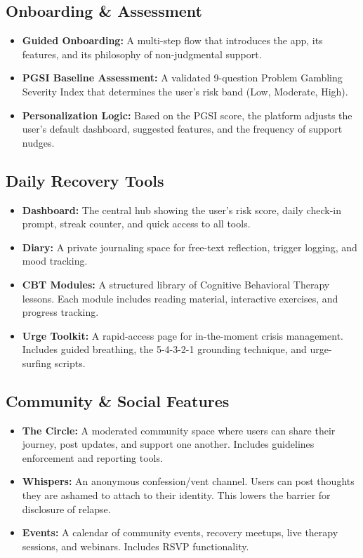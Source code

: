\documentclass[11pt,a4paper]{article}
\begin{document}
\subsection{Onboarding \& Assessment}
\begin{itemize}
    \item \textbf{Guided Onboarding:} A multi-step flow that introduces the app, its features, and its philosophy of non-judgmental support.
    \item \textbf{PGSI Baseline Assessment:} A validated 9-question Problem Gambling Severity Index that determines the user's risk band (Low, Moderate, High).
    \item \textbf{Personalization Logic:} Based on the PGSI score, the platform adjusts the user's default dashboard, suggested features, and the frequency of support nudges.
\end{itemize}

\subsection{Daily Recovery Tools}
\begin{itemize}
    \item \textbf{Dashboard:} The central hub showing the user's risk score, daily check-in prompt, streak counter, and quick access to all tools.
    \item \textbf{Diary:} A private journaling space for free-text reflection, trigger logging, and mood tracking.
    \item \textbf{CBT Modules:} A structured library of Cognitive Behavioral Therapy lessons. Each module includes reading material, interactive exercises, and progress tracking.
    \item \textbf{Urge Toolkit:} A rapid-access page for in-the-moment crisis management. Includes guided breathing, the 5-4-3-2-1 grounding technique, and urge-surfing scripts.
\end{itemize}

\subsection{Community \& Social Features}
\begin{itemize}
    \item \textbf{The Circle:} A moderated community space where users can share their journey, post updates, and support one another. Includes guidelines enforcement and reporting tools.
    \item \textbf{Whispers:} An anonymous confession/vent channel. Users can post thoughts they are ashamed to attach to their identity. This lowers the barrier for disclosure of relapse.
    \item \textbf{Events:} A calendar of community events, recovery meetups, live therapy sessions, and webinars. Includes RSVP functionality.
\end{itemize}
\end{document}
